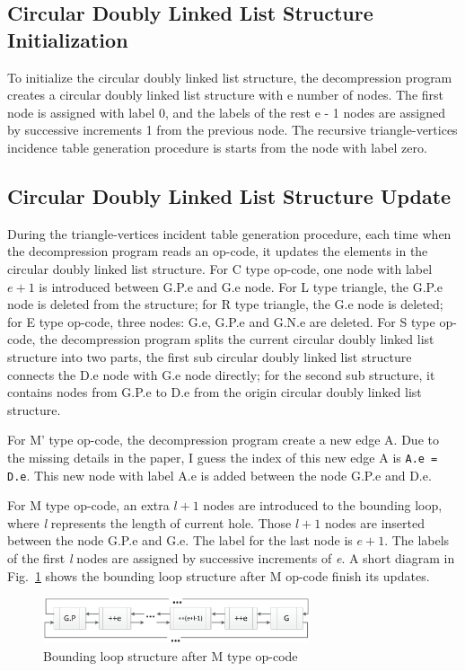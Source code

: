 \documentclass[onecolumn, 12pt]{article}
\begin{document}
{\subsection{Circular Doubly Linked List Structure Initialization}
To initialize the circular doubly linked list structure, the decompression program creates a circular doubly linked list structure with e number of nodes. The first node is assigned with label 0, and the labels of the rest e - 1 nodes are assigned by successive increments 1 from the previous node. The recursive triangle-vertices incidence table generation procedure is starts from the node with label zero.


\subsection{Circular Doubly Linked List Structure Update} \label{sec:BEdgeUpdate}
During the triangle-vertices incident table generation procedure, each time when the decompression program reads an op-code, it updates the elements in the circular doubly linked list structure. For C type op-code, one node with label $e + 1$ is introduced between G.P.e and G.e node. For L type triangle, the G.P.e node is deleted from the structure; for R type triangle, the G.e node is deleted; for E type op-code, three nodes: G.e, G.P.e and G.N.e are deleted. For S type op-code, the decompression program splits the current circular doubly linked list structure into two parts, the first sub circular doubly linked list structure connects the D.e node with G.e node directly; for the second sub structure, it contains nodes from G.P.e to D.e from the origin circular doubly linked list structure.

For M' type op-code, the decompression program create a new edge A. Due to the missing details in the paper, I guess the index of this new edge A is \lstinline!A.e = D.e!. This new node with label A.e is added between the node G.P.e and D.e.

For M type op-code, an extra $l + 1$ nodes are introduced to the bounding loop, where {\it l} represents the length of current hole. Those $l + 1$ nodes are inserted between the node G.P.e and G.e. The label for the last node is $e + 1$. The labels of the first {\it l} nodes are assigned by successive increments of {\it e}. A short diagram in Fig.~\ref{fig:typeM_boundary} shows the bounding loop structure after M op-code finish its updates.

\begin{figure}[h]
\centering
\includegraphics[width=0.7\textwidth, clip, keepaspectratio]{fig_typeM_boundary.eps}
\caption{Bounding loop structure after M type op-code}\label{fig:typeM_boundary}
\end{figure}

}
\end{document}
